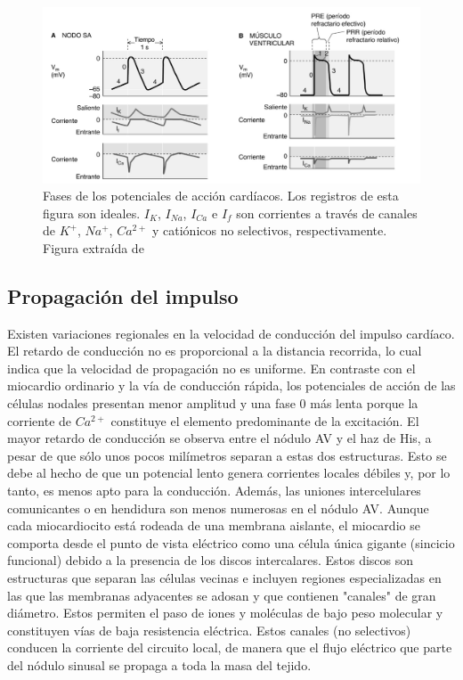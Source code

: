     \begin{figure}[H]
        \centering
        \includegraphics[scale=0.45]{sections/chapter-02/images/action_potential_phases.png}
        \caption[Fases de los potenciales de acción cardíacos.]{Fases de los potenciales de acción cardíacos. Los registros de esta figura son ideales. $I_K$, $I_{Na}$, $I_{Ca}$ e $I_f$ son corrientes a través de canales de $K^+$, $Na^+$, $Ca^{2+}$ y catiónicos no selectivos, respectivamente. Figura extraída de \cite{bk:boron3ed}} 
        \label{fig:action_potential_phases}
    \end{figure}
    
    \subsection{Propagación del impulso}
    
    \indent Existen variaciones regionales en la velocidad de conducción del impulso cardíaco. \\
    \indent El retardo de conducción no es proporcional a la distancia recorrida, lo cual indica que la velocidad de propagación no es uniforme. En contraste con el miocardio ordinario y la vía de conducción rápida, los potenciales de acción de las células nodales presentan menor amplitud y una fase 0 más lenta porque la corriente de $Ca^{2+}$ constituye el elemento predominante de la excitación. El mayor retardo de conducción se observa entre el nódulo AV y el haz de His, a pesar de que sólo unos pocos milímetros separan a estas dos estructuras. Esto se debe al hecho de que un potencial lento genera corrientes locales débiles y, por lo tanto, es menos apto para la conducción. Además, las uniones intercelulares comunicantes o en hendidura son menos numerosas en el nódulo AV. Aunque cada miocardiocito está rodeada de una membrana aislante, el miocardio se comporta desde el punto de vista eléctrico como una célula única gigante (sincicio funcional) debido a la presencia de los discos intercalares. Estos discos son estructuras que separan las células vecinas e incluyen regiones especializadas en las que las membranas adyacentes se adosan y que contienen "canales" de gran diámetro. Estos permiten el paso de iones y moléculas de bajo peso molecular y constituyen vías de baja resistencia eléctrica. Estos canales (no selectivos) conducen la corriente del circuito local, de manera que el flujo eléctrico que parte del nódulo sinusal se propaga a toda la masa del tejido.

